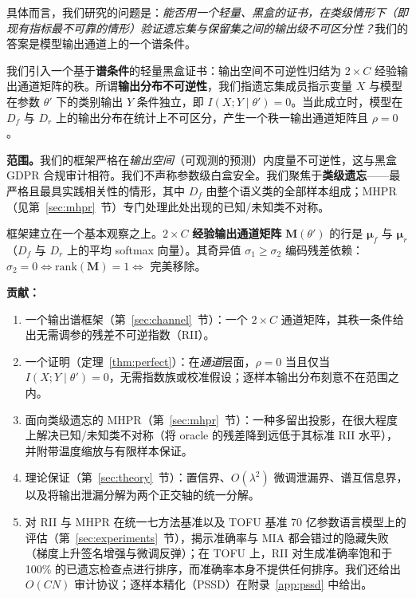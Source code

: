 \documentclass[11pt,a4paper]{article}
\begin{document}
具体而言，我们研究的问题是：\emph{能否用一个轻量、黑盒的证书，在类级情形下（即现有指标最不可靠的情形）验证遗忘集与保留集之间的输出级不可区分性？}我们的答案是模型输出通道上的一个谱条件。

我们引入一个基于\textbf{谱条件}的轻量黑盒证书：输出空间不可逆性归结为 $2\times C$ 经验输出通道矩阵的秩。所谓\textbf{输出分布不可逆性}，我们指遗忘集成员指示变量 $X$ 与模型在参数 $\theta'$ 下的类别输出 $Y$ 条件独立，即 $I(X;Y\mid\theta')=0$。当此成立时，模型在 $D_f$ 与 $D_r$ 上的输出分布在统计上不可区分，产生一个秩一输出通道矩阵且 $\rho=0$。

\textbf{范围。}我们的框架严格在\emph{输出空间}（可观测的预测）内度量不可逆性，这与黑盒 GDPR 合规审计相符。我们不声称参数级白盒安全。我们聚焦于\textbf{类级遗忘}——最严格且最具实践相关性的情形，其中 $D_f$ 由整个语义类的全部样本组成；MHPR（见第~\ref{sec:mhpr}~节）专门处理此处出现的已知/未知类不对称。

框架建立在一个基本观察之上。$2\times C$ \textbf{经验输出通道矩阵} $\mathbf{M}(\theta')$ 的行是 $\boldsymbol{\mu}_f$ 与 $\boldsymbol{\mu}_r$（$D_f$ 与 $D_r$ 上的平均 softmax 向量）。其奇异值 $\sigma_1 \ge \sigma_2$ 编码残差依赖：$\sigma_2 = 0 \iff \mathrm{rank}(\mathbf{M}) = 1 \iff$ 完美移除。

\textbf{贡献：}
\begin{enumerate}
\item 一个输出谱框架（第~\ref{sec:channel}~节）：一个 $2\times C$ 通道矩阵，其秩一条件给出无需调参的残差不可逆指数（RII）。
\item 一个证明（定理~\ref{thm:perfect}）：在\emph{通道}层面，$\rho=0$ 当且仅当 $I(X;Y\mid\theta')=0$，无需指数族或校准假设；逐样本输出分布刻意不在范围之内。
\item 面向类级遗忘的 MHPR（第~\ref{sec:mhpr}~节）：一种多留出投影，在很大程度上解决已知/未知类不对称（将 oracle 的残差降到远低于其标准 RII 水平），并附带温度缩放与有限样本保证。
\item 理论保证（第~\ref{sec:theory}~节）：置信界、$O(\lambda^2)$ 微调泄漏界、谱互信息界，以及将输出泄漏分解为两个正交轴的统一分解。
\item 对 RII 与 MHPR 在统一七方法基准以及 TOFU 基准 70 亿参数语言模型上的评估（第~\ref{sec:experiments}~节），揭示准确率与 MIA 都会错过的隐藏失败（梯度上升签名增强与微调反弹）；在 TOFU 上，RII 对生成准确率饱和于 100\% 的已遗忘检查点进行排序，而准确率本身不提供任何排序。我们还给出 $O(CN)$ 审计协议；逐样本精化（PSSD）在附录~\ref{app:pssd} 中给出。
\end{enumerate}

\end{document}
